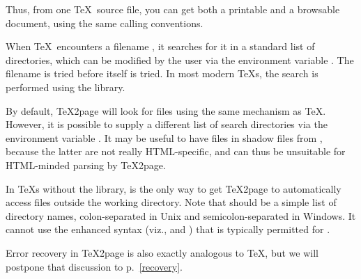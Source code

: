 Thus, from one \TeX\ source file, you can get both a printable  and a
browsable  document, using the same calling
conventions.\iffalse ifx\inpltdist\undefined\f{Quite a few documents profit from
being available additionally as plain text, either as a man page, or as
tagged text on a general-purpose text editor, instead of requiring an HTML
browser.  The scripts \p{t2p2man},
\p{t2p2txt}, and \p{t2p2info}, included in the \TeX2page distribution,
help accomplish this.
Each of these scripts takes as argument the main HTML
file \p{|meta[jobname].html} created by \TeX2page, and generate the
corresponding man page \p{|meta[jobname].1},
the Vim help file \p{|meta[jobname].txt}, and the
Info file
\p{|meta[jobname].info}
respectively.  While the man page is always a single page, the Info and
Vim-help output is composed of multiple files if the HTML document contains
pagebreaks.}\fi



When \TeX\ encounters a filename , it
searches for it
in a standard list of
directories, which can be modified by the user via the
environment variable .
The filename  is tried before
 itself is tried.  In most modern \TeX s, the
search is performed using the  library.

By default, \TeX2page will look for files using the same 
mechanism as \TeX.  However, it is possible to supply a
different list of search directories via the environment
variable .
It may be useful to have
files in  shadow files from
, because the latter are not really
HTML-specific, and can thus be unsuitable for
HTML-minded parsing by \TeX2page.

In \TeX s without the  library,
 is the only way to get \TeX2page to
automatically access files outside the working
directory.  Note that  should be a
simple list of directory names, colon-separated in Unix
and semicolon-separated in Windows.  It cannot use the
enhanced syntax (viz., \p{*} and \p{//}) that is
typically permitted for .

%
Error recovery in \TeX2page is also exactly analogous to
\TeX, but we will postpone that discussion to
p.~\ref{recovery}.

